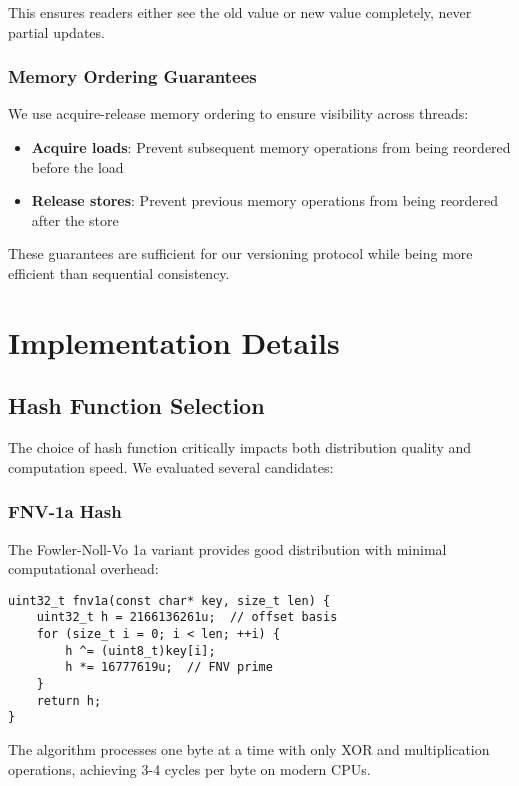 \documentclass[11pt]{article}
\begin{document}
This ensures readers either see the old value or new value completely, never partial updates.

\subsubsection{Memory Ordering Guarantees}
We use acquire-release memory ordering to ensure visibility across threads:
\begin{itemize}
\item \textbf{Acquire loads}: Prevent subsequent memory operations from being reordered before the load
\item \textbf{Release stores}: Prevent previous memory operations from being reordered after the store
\end{itemize}

These guarantees are sufficient for our versioning protocol while being more efficient than sequential consistency.

\section{Implementation Details}
\label{sec:implementation}

\subsection{Hash Function Selection}

The choice of hash function critically impacts both distribution quality and computation speed. We evaluated several candidates:

\subsubsection{FNV-1a Hash}
The Fowler-Noll-Vo 1a variant provides good distribution with minimal computational overhead:

\begin{lstlisting}[caption={FNV-1a implementation},label={lst:fnv1a}]
uint32_t fnv1a(const char* key, size_t len) {
    uint32_t h = 2166136261u;  // offset basis
    for (size_t i = 0; i < len; ++i) {
        h ^= (uint8_t)key[i];
        h *= 16777619u;  // FNV prime
    }
    return h;
}
\end{lstlisting}

The algorithm processes one byte at a time with only XOR and multiplication operations, achieving 3-4 cycles per byte on modern CPUs.
\end{document}
